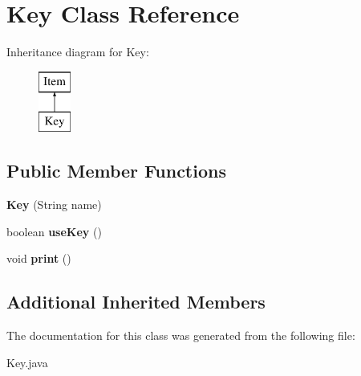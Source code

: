 \hypertarget{class_key}{}\section{Key Class Reference}
\label{class_key}
Inheritance diagram for Key\+:\begin{figure}[H]
\begin{center}
\leavevmode
\includegraphics[height=2.000000cm]{class_key}
\end{center}
\end{figure}
\subsection*{Public Member Functions}
\begin{DoxyCompactItemize}
\item 
\hypertarget{class_key_a27c1696c1be29a28f1e75ed7a0dfc2c8}{}{\bfseries Key} (String name)\label{class_key_a27c1696c1be29a28f1e75ed7a0dfc2c8}

\item 
\hypertarget{class_key_aa0d0ff3ecfb5ba587199644fbaeb5bb6}{}boolean {\bfseries use\+Key} ()\label{class_key_aa0d0ff3ecfb5ba587199644fbaeb5bb6}

\item 
\hypertarget{class_key_a467d8f295f185fa716da3db2f9ca8d55}{}void {\bfseries print} ()\label{class_key_a467d8f295f185fa716da3db2f9ca8d55}

\end{DoxyCompactItemize}
\subsection*{Additional Inherited Members}


The documentation for this class was generated from the following file\+:\begin{DoxyCompactItemize}
\item 
Key.\+java\end{DoxyCompactItemize}
